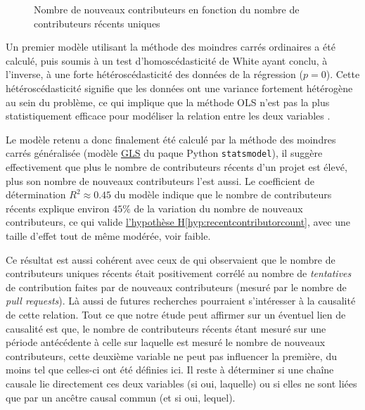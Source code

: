 \documentclass[dvipsnames]{llncs}
\newcommand{\en}[1]{\foreignlanguage{english}{\emph{#1}}}
\begin{document}
\begin{figure}
        

        

        \caption{Nombre de nouveaux contributeurs en fonction du nombre de contributeurs récents uniques}
        \label{fig:contributorCount}
    \end{figure}

    Un premier modèle utilisant la méthode des moindres carrés ordinaires a été calculé, puis soumis à un test
    d'homoscédasticité de White ayant conclu, à l'inverse, à une forte hétéroscédasticité des données de la
    régression ($p = 0$). Cette hétéroscédasticité signifie que les données ont une variance fortement
    hétérogène au sein du problème, ce qui implique que la méthode OLS n'est pas la plus statistiquement
    efficace pour modéliser la relation entre les deux variables \parencite{GLS-2021}.

    Le modèle retenu a donc finalement été calculé par la méthode des moindres carrés généralisée (modèle
    \href{https://www.statsmodels.org/dev/generated/statsmodels.regression.linear_model.GLS.html}{GLS} du
    paque Python \texttt{statsmodel}), il suggère effectivement que plus le nombre de contributeurs récents
    d'un projet est élevé, plus son nombre de nouveaux contributeurs l'est aussi. Le coefficient de
    détermination $R^2 \approx 0.45$ du modèle indique que le nombre de contributeurs récents explique environ
    $45\%$ de la variation du nombre de nouveaux contributeurs, ce qui valide
    \hyperref[hyp:recentcontributorcount]{l'hypothèse H\ref*{hyp:recentcontributorcount}}, avec une taille
    d'effet tout de même modérée, voir faible.

    Ce résultat est aussi cohérent avec ceux de \textcite[p.~12-13,16]{signals-2019} qui observaient que le
    nombre de contributeurs uniques récents était positivement corrélé au nombre de \emph{tentatives} de
    contribution faites par de nouveaux contributeurs (mesuré par le nombre de \en{pull requests}). Là aussi
    de futures recherches pourraient s'intéresser à la causalité de cette relation. Tout ce que notre étude
    peut affirmer sur un éventuel lien de causalité est que, le nombre de contributeurs récents étant mesuré
    sur une période antécédente à celle sur laquelle est mesuré le nombre de nouveaux contributeurs, cette
    deuxième variable ne peut pas influencer la première, du moins tel que celles-ci ont été définies ici. Il
    reste à déterminer si une chaîne causale lie directement ces deux variables (si oui, laquelle) ou si elles
    ne sont liées que par un ancêtre causal commun (et si oui, lequel).
\end{document}
